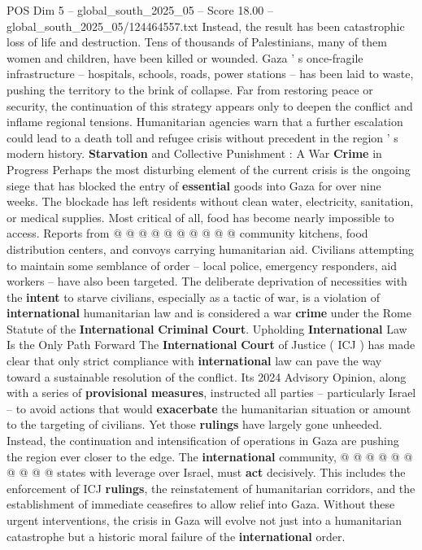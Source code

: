 \begin{textsample}{POS Dim 5 – global\_south\_2025\_05 – Score 18.00 – global\_south\_2025\_05/124464557.txt}
Instead, the result has been catastrophic loss of life and destruction.
Tens of thousands of Palestinians, many of them women and children, have been killed or wounded.
Gaza ' s once-fragile infrastructure -- hospitals, schools, roads, power stations -- has been laid to waste, pushing the territory to the brink of collapse.
Far from restoring peace or security, the continuation of this strategy appears only to deepen the conflict and inflame regional tensions.
Humanitarian agencies warn that a further escalation could lead to a death toll and refugee crisis without precedent in the region ' s modern history. \textbf{Starvation} and Collective Punishment : A War \textbf{Crime} in Progress Perhaps the most disturbing element of the current crisis is the ongoing siege that has blocked the entry of \textbf{essential} goods into Gaza for over nine weeks.
The blockade has left residents without clean water, electricity, sanitation, or medical supplies.
Most critical of all, food has become nearly impossible to access.
Reports from @ @ @ @ @ @ @ @ @ @ community kitchens, food distribution centers, and convoys carrying humanitarian aid.
Civilians attempting to maintain some semblance of order -- local police, emergency responders, aid workers -- have also been targeted.
The deliberate deprivation of necessities with the \textbf{intent} to starve civilians, especially as a tactic of war, is a violation of \textbf{international} humanitarian law and is considered a war \textbf{crime} under the Rome Statute of the \textbf{International} \textbf{Criminal} \textbf{Court}.
Upholding \textbf{International} Law Is the Only Path Forward The \textbf{International} \textbf{Court} of Justice ( ICJ ) has made clear that only strict compliance with \textbf{international} law can pave the way toward a sustainable resolution of the conflict.
Its 2024 Advisory Opinion, along with a series of \textbf{provisional} \textbf{measures}, instructed all parties -- particularly Israel -- to avoid actions that would \textbf{exacerbate} the humanitarian situation or amount to the targeting of civilians.
Yet those \textbf{rulings} have largely gone unheeded.
Instead, the continuation and intensification of operations in Gaza are pushing the region ever closer to the edge.
The \textbf{international} community, @ @ @ @ @ @ @ @ @ @ states with leverage over Israel, must \textbf{act} decisively.
This includes the enforcement of ICJ \textbf{rulings}, the reinstatement of humanitarian corridors, and the establishment of immediate ceasefires to allow relief into Gaza.
Without these urgent interventions, the crisis in Gaza will evolve not just into a humanitarian catastrophe but a historic moral failure of the \textbf{international} order.

\end{textsample}
